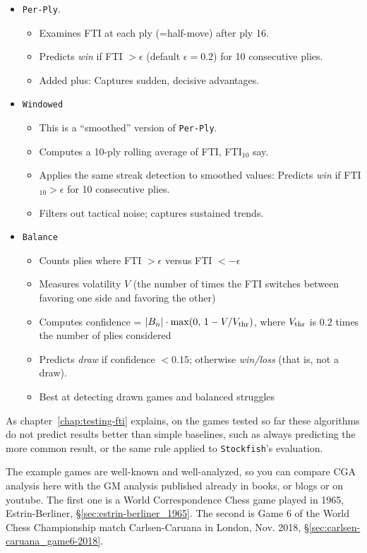 \documentclass[12pt]{book}
\begin{document}
\begin{itemize}
\item
  {\tt Per-Ply}.
 \begin{itemize}
 \item
  Examines FTI at each ply (=half-move) after ply 16.
 \item
   Predicts {\it win} if FTI $> \epsilon$ (default $\epsilon = 0.2$)
   for 10 consecutive plies.
 \item
  Added plus: Captures sudden, decisive advantages.
 \end{itemize}
\item
  {\tt Windowed}
 \begin{itemize}
 \item
 This is a ``smoothed'' version of {\tt Per-Ply}.
 \item
  Computes a 10-ply rolling average of FTI, FTI$_{10}$ say.
 \item
   Applies the same streak detection to smoothed values:
   Predicts {\it win} if FTI$_{10} > \epsilon$ 
   for 10 consecutive plies.
 \item
  Filters out tactical noise; captures sustained trends.
 \end{itemize}
\item
  {\tt Balance} 
 \begin{itemize}
 \item
 Counts plies where FTI $> \epsilon$ versus FTI $<- \epsilon$
 \item
 Measures volatility $V$ (the number of times the FTI switches between
 favoring one side and favoring the other)
 \item
   Computes confidence = $|B_n|\cdot \max(0,\, 1 - V/V_{\rm thr})$,
   where $V_{\rm thr}$ is $0.2$ times the number of plies considered
\item   
  Predicts {\it draw} if confidence $<0.15$; otherwise {\it win/loss}
  (that is, not a draw).
\item
  Best at detecting drawn games and balanced struggles
 \end{itemize}
 \end{itemize}

\noindent
As chapter~\ref{chap:testing-fti} explains, on the games tested so far these
algorithms do not predict results better than simple baselines, such as
always predicting the more common result, or the same rule applied to
{\tt Stockfish}'s evaluation.

The example games are well-known and well-analyzed, so you can
compare CGA analysis here with the GM analysis published already
in books, or blogs or on youtube.
The first one is a World Correspondence Chess game played in 1965,
Estrin-Berliner, \S \ref{sec:estrin-berliner_1965}.
The second is Game 6 of the World Chess Championship match
Carlsen-Caruana in London, Nov. 2018, \S \ref{sec:carlsen-caruana_game6-2018}.
\end{document}
